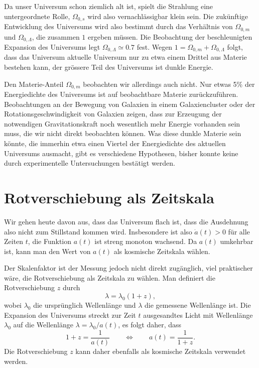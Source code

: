 Da unser Universum schon ziemlich alt ist, spielt die Strahlung
eine untergeordnete Rolle, $\Omega_{0,s}$ wird also vernachlässigbar
klein sein. 
Die zukünftige Entwicklung des Universums wird also bestimmt durch
das Verhältnis von $\Omega_{0,m}$ und $\Omega_{0,\Lambda}$, die
zusammen $1$ ergeben müssen.
Die Beobachtung der beschleunigten Expansion des Universums 
legt $\Omega_{0,\Lambda}\simeq 0.7$ fest.
Wegen $1=\Omega_{0,m}+\Omega_{0,\Lambda}$ folgt, dass das
Universum aktuelle Universum nur zu etwa einem Drittel aus 
Materie bestehen kann, der grössere Teil des Universums ist
dunkle Energie.

Den Materie-Anteil $\Omega_{0,m}$ beobachten wir allerdings auch
nicht.
Nur etwas 5\% der Energiedichte des Universums ist auf beobachtbare
Materie zurückzuführen.
Beobachtungen an der Bewegung von Galaxien in einem Galaxiencluster
oder der Rotationsgeschwindigkeit von Galaxien zeigen, dass zur Erzeugung
der notwendigen Gravitationskraft noch wesentlich mehr Energie vorhanden
sein muss, die wir nicht direkt beobachten können.
Was diese dunkle Materie sein könnte, die immerhin etwa einen Viertel der
Energiedichte des aktuellen Universums ausmacht, gibt es verschiedene
Hypothesen, bisher konnte keine durch experimentelle Untersuchungen
bestätigt werden.

\section{Rotverschiebung als Zeitskala%
\label{skript:section:rotverschiebung}}
Wir gehen heute davon aus, dass das Universum flach ist, dass die
Ausdehnung also nicht zum Stillstand kommen wird.
Insbesondere ist also $\dot a(t)>0$ für alle Zeiten $t$, die Funktion
$a(t)$ ist streng monoton wachsend.
Da $a(t)$ umkehrbar ist, kann man den Wert von $a(t)$ als kosmische
Zeitskala wählen.

Der Skalenfaktor ist der Messung jedoch nicht direkt zugänglich,
viel praktischer wäre, die Rotverschiebung als Zeitskala zu wählen.
Man definiert die Rotverschiebung $z$ durch
\[
\lambda = \lambda_0(1+z),
\]
wobei $\lambda_0$ die ursprünglich Wellenlänge und $\lambda$ die
gemessene Wellenlänge ist.
Die Expansion des Universums streckt zur Zeit $t$ ausgesandtes Licht mit
Wellenlänge $\lambda_0$ auf die Wellenlänge $\lambda=\lambda_0/a(t)$,
es folgt daher, dass
\[
1+z=\frac{1}{a(t)}
\qquad\Leftrightarrow\qquad
a(t)=\frac1{1+z}.
\]
Die Rotverschiebung $z$ kann daher ebenfalls als kosmische Zeitskala 
verwendet werden.

